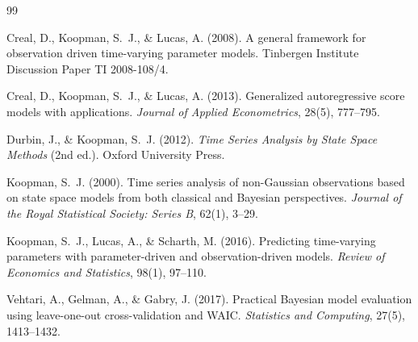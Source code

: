 \documentclass[11pt,a4paper]{article}
\begin{document}

\begin{thebibliography}{99}

Creal, D., Koopman, S.~J., \& Lucas, A. (2008).
\newblock A general framework for observation driven time-varying parameter models.
\newblock Tinbergen Institute Discussion Paper TI 2008-108/4.

Creal, D., Koopman, S.~J., \& Lucas, A. (2013).
\newblock Generalized autoregressive score models with applications.
\newblock \textit{Journal of Applied Econometrics}, 28(5), 777--795.

Durbin, J., \& Koopman, S.~J. (2012).
\newblock \textit{Time Series Analysis by State Space Methods} (2nd ed.).
\newblock Oxford University Press.

Koopman, S.~J. (2000).
\newblock Time series analysis of non-Gaussian observations based on state space models from both classical and Bayesian perspectives.
\newblock \textit{Journal of the Royal Statistical Society: Series B}, 62(1), 3--29.

Koopman, S.~J., Lucas, A., \& Scharth, M. (2016).
\newblock Predicting time-varying parameters with parameter-driven and observation-driven models.
\newblock \textit{Review of Economics and Statistics}, 98(1), 97--110.

Vehtari, A., Gelman, A., \& Gabry, J. (2017).
\newblock Practical Bayesian model evaluation using leave-one-out cross-validation and WAIC.
\newblock \textit{Statistics and Computing}, 27(5), 1413--1432.

\end{thebibliography}
\end{document}
